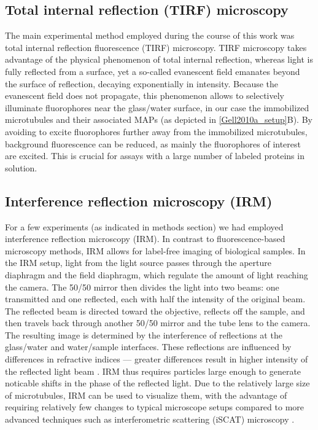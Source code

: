 \subsection{Total internal reflection (TIRF) microscopy}
The main experimental method employed during the course of this work was total internal reflection fluorescence (TIRF) microscopy. TIRF microscopy takes advantage of the physical phenomenon of total internal reflection, whereas light is fully reflected from a surface, yet a so-called evanescent field emanates beyond the surface of reflection, decaying exponentially in intensity. Because the evanescent field does not propagate, this phenomenon allows to selectively illuminate fluorophores near the glass/water surface, in our case the immobilized microtubules and their associated MAPs (as depicted in \ref{Gell2010a_setup}B). By avoiding to excite fluorophores further away from the immobilized microtubules, background fluorescence can be reduced, as mainly the fluorophores of interest are excited. This is crucial for assays with a large number of labeled proteins in solution. 

\subsection{Interference reflection microscopy (IRM)}
For a few experiments (as indicated in methods section) we had employed interference reflection microscopy (IRM). In contrast to fluorescence-based microscopy methods, IRM allows for label-free imaging of biological samples. In the IRM setup, light from the light source passes through the aperture diaphragm and the field diaphragm, which regulate the amount of light reaching the camera. The 50/50 mirror then divides the light into two beams: one transmitted and one reflected, each with half the intensity of the original beam. The reflected beam is directed toward the objective, reflects off the sample, and then travels back through another 50/50 mirror and the tube lens to the camera. The resulting image is determined by the interference of reflections at the glass/water and water/sample interfaces. These reflections are influenced by differences in refractive indices — greater differences result in higher intensity of the reflected light beam \parencite{barr2009interference}. IRM thus requires particles large enough to generate noticable shifts in the phase of the reflected light. Due to the relatively large size of microtubules, IRM can be used to visualize them, with the advantage of requiring relatively few changes to typical microscope setups compared to more advanced techniques such as interferometric scattering
(iSCAT) microscopy \parencite{Mahamdeh2018}.

